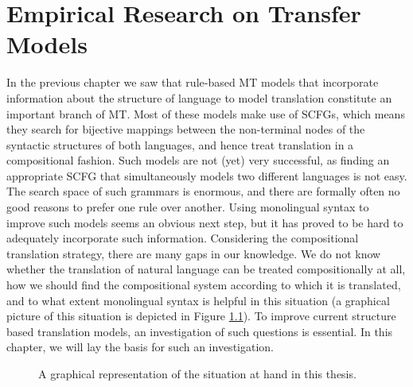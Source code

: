 \chapter{Empirical Research on Transfer Models}
\label{ch:empirical}

In the previous chapter we saw that rule-based MT models that incorporate information about the structure of language to model translation constitute an important branch of MT. Most of these models make use of SCFGs, which means they search  for bijective mappings between the non-terminal nodes of the syntactic structures of both languages, and hence treat translation in a compositional fashion. Such models are not (yet) very successful, as finding an appropriate SCFG that simultaneously models two different languages is not easy. The search space of such grammars is enormous, and there are formally often no good reasons to prefer one rule over another. Using monolingual syntax to improve such models seems an obvious next step, but it has proved to be hard to adequately incorporate such information. Considering the compositional translation strategy, there are many gaps in our knowledge. We do not know whether the translation of natural language can be treated compositionally at all, how we should find the compositional system according to which it is translated, and to what extent monolingual syntax is helpful in this situation (a graphical picture of this situation is depicted in Figure \ref{fig:comptrans2}). To improve current structure based translation models, an investigation of such questions is essential. In this chapter, we will lay the basis for such an investigation. 

\begin{figure}[!ht]
\begin{framed}
\centering

\end{framed}
\caption{A graphical representation of the situation at hand in this thesis.}\label{fig:comptrans2}
\end{figure}

